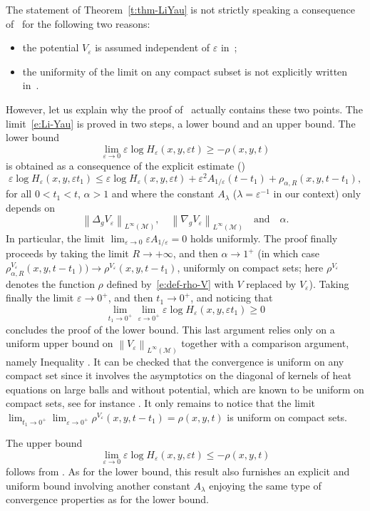\documentclass[11pt]{article}
\numberwithin{equation}{section}
\theoremstyle{definition}
\newcommand{\M}{\ensuremath{\mathcal M}}
\newcommand\nor[2]{\left\|#1\right\|_{#2}}
\let\e\varepsilon
\let\eps\varepsilon
\begin{document}
The statement of Theorem~\ref{t:thm-LiYau} is not strictly speaking a consequence of~\cite[Th.\,6.1]{LY86} for the following two reasons:
\begin{itemize}
\item the potential $V_\eps$ is assumed independent of $\eps$ in~\cite{LY86};
\item the uniformity of the limit on any compact subset is not explicitly written in~\cite{LY86}.
\end{itemize}
However, let us explain why the proof of~\cite[Th.\,6.1]{LY86} actually contains these two points.
The limit~\eqref{e:Li-Yau} is proved in two steps, a lower bound and an upper bound.
The lower bound
\[
\underset{\e\to 0}{\lim}\e \log H_{\e}(x,y,\e t) \geq -\rho(x,y,t)
\]
is obtained as a consequence of the explicit estimate (\cite[Th.\,2.1]{LY86})
\[
\e \log H_{\e}(x,y,\e t_1) \leq \e \log H_{\e}(x,y,\e t)
+ \eps^2 A_{1/\eps} (t-t_1) + \rho_{\alpha,R}(x,y,t-t_1),
\]
for all $0<t_1<t$, $\alpha>1$ and
where the constant $A_{\lambda}$ ($\lambda=\e^{-1}$ in our context) only depends on
\[
\nor{\Delta_g V_\eps}{L^\infty(\M)},\quad \nor{\nabla_g V_\eps}{L^\infty(\M)}\quad\text{and}\quad\alpha.
\]
In particular, the limit $\lim_{\eps\to 0} \eps A_{1/\eps} = 0$ holds uniformly.
The proof finally proceeds by taking the limit $R\to + \infty$, and then $\alpha \to 1^+$ (in which case $\rho^{V_\eps}_{\alpha,R}(x,y,t-t_1)) \to \rho^{V_\eps}(x,y,t-t_1)$, uniformly on compact sets; here $\rho^{V_\eps}$ denotes the function $\rho$ defined by~\eqref{e:def-rho-V} with $V$ replaced by $V_\eps$). Taking finally the limit $\eps \to 0^+$, and then $t_1 \to 0^+$, and noticing that\enlargethispage{-\baselineskip}
\[
\lim_{t_1\to 0^+}\lim_{\eps \to 0^+} \e \log H_{\e}(x,y,\e t_1) \geq 0
\]
concludes the proof of the lower bound.
This last argument relies only on a uniform upper bound on $\nor{V_\eps}{L^\infty(\M)}$ together with a comparison argument, namely Inequa\-lity \cite[(6.3)]{LY86}. It can be checked that the convergence is uniform on any compact set since it involves the asymptotics on the diagonal of kernels of heat equations on large balls and without potential, which are known to be uniform on compact sets, see for instance \cite[Th.\,4.6]{Va:67b}.
It only remains to notice that the limit $\lim_{t_1\to 0^+} \lim_{\eps \to 0^+} \rho^{V_\eps}(x,y,t-t_1) = \rho(x,y, t)$ is uniform on compact sets.

The upper bound
\[
\underset{\e\to 0}{\lim}\e \log H_{\e}(x,y,\e t) \leq -\rho(x,y,t)
\]
follows from \cite[Th.\,3.3]{LY86}. As for the lower bound, this result also furnishes an explicit and uniform bound involving another constant $A_{\lambda}$ enjoying the same type of convergence properties as for the lower bound.
\end{document}
